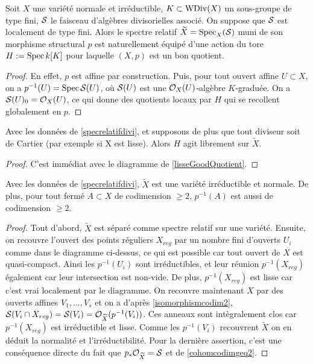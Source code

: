 \begin{cons}\label{specrelatifdivi}
Soit $X$ une variété normale et irréductible, $K\subset \operatorname{WDiv}(X)$ un sous-groupe de type fini, $\mathcal{S}$ le faisceau d'algèbres divisorielles associé. On suppose que $\mathcal{S}$ est localement de type fini. Alors le spectre relatif $\widetilde{X}=\operatorname{Spec}_X(\mathcal{S})$ muni de son morphisme structural $p$ est naturellement équipé d'une action du tore $H:=\operatorname{Spec} k[K]$ pour laquelle $(X,p)$ est un bon quotient.
\end{cons}
\begin{proof}
En effet, $p$ est affine par construction. Puis, pour tout ouvert affine $U\subset X$, on a $p^{-1}(U)=\operatorname{Spec} \mathcal{S}(U)$, où $\mathcal{S}(U)$ est une $\mathcal{O}_X(U)$-algèbre $K$-graduée. On a $\mathcal{S}(U)_0=\mathcal{O}_X(U)$, ce qui donne des quotients locaux par $H$ qui se recollent globalement en $p$.
\end{proof}

\begin{prop}
Avec les données de \ref{specrelatifdivi}, et supposons de plus que tout diviseur soit de Cartier (par exemple si X est lisse). Alors $H$ agit librement sur $\widetilde{X}$.
\end{prop}
\begin{proof}
C'est immédiat avec le diagramme de \ref{lisseGoodQuotient}.
\end{proof}


\begin{prop}\label{preimagecodim2}
Avec les données de \ref{specrelatifdivi}, $\widetilde{X}$ est une variété irréductible et normale. De plus, pour tout fermé $A\subset X$ de codimension $\geq 2$, $p^{-1}(A)$ est aussi de codimension $\geq 2$.
\end{prop}
\begin{proof}
Tout d'abord, $\widetilde{X}$ est séparé comme spectre relatif sur une variété. Ensuite, on recouvre l'ouvert des points réguliers $X_{reg}$ par un nombre fini d'ouverts $U_i$ comme dans le diagramme ci-dessus, ce qui est possible car tout ouvert de $X$ est quasi-compact. Ainsi les $p^{-1}(U_i)$ sont irréductibles, et leur réunion $p^{-1}(X_{reg})$ également car leur intersection est non-vide. De plus, $p^{-1}(X_{reg})$ est lisse car c'est vrai localement par le diagramme. On recouvre maintenant $X$ par des ouverts affines $V_1,...,V_s$ et on a d'après \ref{isomorphismcodim2}, $\mathcal{S}(V_i\cap X_{reg})=\mathcal{S}(V_i)=\mathcal{O}_{\widetilde{X}}(p^{-1}(V_i))$. Ces anneaux sont intègralement clos car $p^{-1}(X_{reg})$ est irréductible et lisse. Comme les $p^{-1}(V_i)$ recouvrent $\widetilde{X}$ on en déduit la normalité et l'irréductibilité.
Pour la dernière assertion, c'est une conséquence directe du fait que $p_*\mathcal{O}_{\widetilde{X}}=\mathcal{S}$ et de \ref{cohomcodimgeq2}.
\end{proof}


